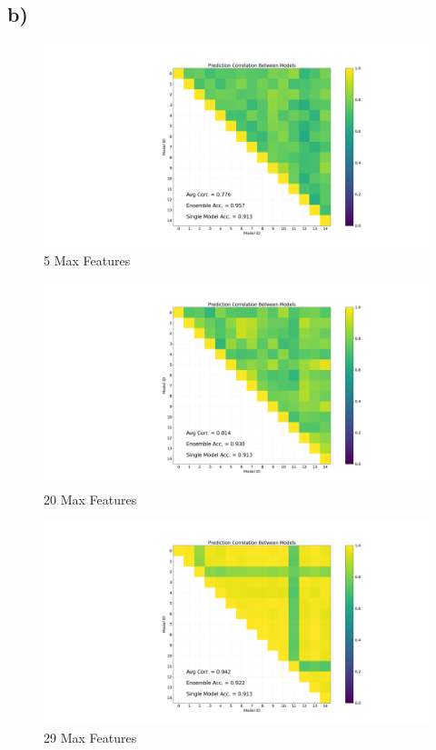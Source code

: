 \documentclass{article}
\begin{document}
        \subsection*{b)}
            \begin{figure}[!h]
                \centering
                \includegraphics[width=\textwidth]{"max_features_5.png"}
                \caption{5 Max Features}
            \end{figure}
            \begin{figure}[!h]
                \centering
                \includegraphics[width=\textwidth]{"max_features_20.png"}
                \caption{20 Max Features}
            \end{figure}
            \begin{figure}[!h]
                \centering
                \includegraphics[width=\textwidth]{"max_features_29.png"}
                \caption{29 Max Features}
            \end{figure}
\end{document}
